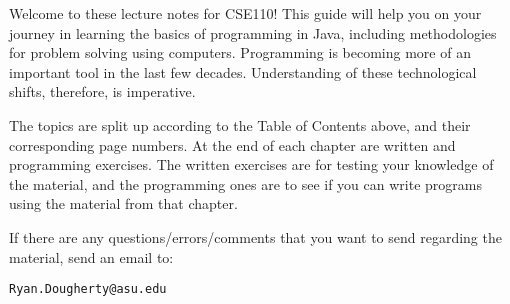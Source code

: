 %
Welcome to these lecture notes for CSE110! This guide will help you on your journey in learning the basics of programming in Java, including methodologies for problem solving using computers. Programming is becoming more of an important tool in the last few decades. Understanding of these technological shifts, therefore, is imperative. 

\par The topics are split up according to the Table of Contents above, and their corresponding page numbers. At the end of each chapter are written and programming exercises. The written exercises are for testing your knowledge of the material, and the programming ones are to see if you can write programs using the material from that chapter. 

\par If there are any questions/errors/comments that you want to send regarding the material, send an email to:
\begin{center}
\texttt{Ryan.Dougherty@asu.edu}
\end{center}